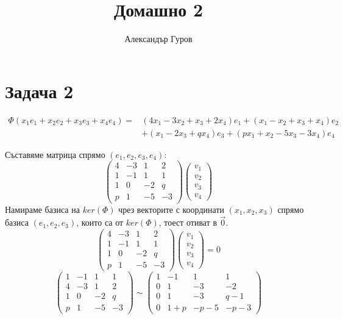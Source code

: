 \documentclass{article}
\title{Домашно 2}
\author{Александър Гуров}
\date{\datebulgarian{\today}}
\begin{document}
\maketitle
\section*{Задача 2}
\begin{align*}
    \Phi ( x_1 e_1 + x_2 e _2 + x_3 e_3 + x_4 e_4) = & ( 4 x_1 - 3 x_2 + x_3 + 2 x_4) e_1 + ( x_1 - x_2 + x_3 + x_4) e_2 \\
                                                     & + ( x_1 - 2 x_3 + q x_4) e_3 + ( p x_1 + x_2 -5 x_3 - 3 x_4) e_4
\end{align*}

Съставяме матрица спрямо $(e_1,e_2,e_3,e_4)$:
\[
    \left(\begin{array}{cccc}
            4 & -3 & 1  & 2  \\
            1 & -1 & 1  & 1  \\
            1 & 0  & -2 & q  \\
            p & 1  & -5 & -3
        \end{array}\right)
    \left(\begin{array}{c}
            v_1 \\
            v_2 \\
            v_3 \\
            v_4
        \end{array}\right)
\]
Намираме базиса на $ker(\Phi)$ чрез векторите с координати $(x_1,x_2,x_3)$ спрямо базиса $(e_1,e_2,e_3)$,
които са от $ker(\Phi)$, тоест отиват в $\vec{0}$.
\[
    \left(\begin{array}{cccc}
            4 & -3 & 1  & 2  \\
            1 & -1 & 1  & 1  \\
            1 & 0  & -2 & q  \\
            p & 1  & -5 & -3
        \end{array}\right)
    \left(\begin{array}{c}
            v_1 \\
            v_2 \\
            v_3 \\
            v_4
        \end{array}\right)
    =0
\]
\[
    \left(\begin{array}{cccc}
            1 & -1 & 1  & 1  \\
            4 & -3 & 1  & 2  \\
            1 & 0  & -2 & q  \\
            p & 1  & -5 & -3
        \end{array}\right)
    \sim\left(\begin{array}{cccc}
            1 & -1  & 1    & 1    \\
            0 & 1   & -3   & -2   \\
            0 & 1   & -3   & q-1  \\
            0 & 1+p & -p-5 & -p-3
        \end{array}\right)
\]
\end{document}
